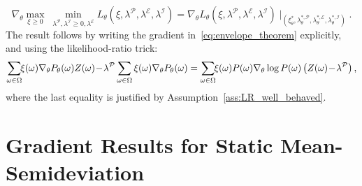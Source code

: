%
\begin{equation}\label{eq:envelope_theorem}
\nabla_\theta\max_{\xi\geq 0}\;\min_{\lambda^{\mathcal P},\lambda^{\mathcal I}\geq 0,\lambda^{\mathcal E}} L_{\theta}(\xi,\lambda^{\mathcal P},\lambda^{\mathcal E},\lambda^{\mathcal I}) = \nabla_\theta L_{\theta}(\xi,\lambda^{\mathcal P},\lambda^{\mathcal E},\lambda^{\mathcal I})\!\!\mid_{(\xi^*_{\theta},\lambda^{*,\mathcal P}_{\theta},\lambda^{*,\mathcal E}_{\theta},\lambda^{*,\mathcal I}_{\theta})}.
\end{equation}
%
The result follows by writing the gradient in~\eqref{eq:envelope_theorem} explicitly, and using the likelihood-ratio trick:
%
\begin{equation*}
   \sum_{\omega \in \Omega} \!\! \xi(\omega) \dt P_\theta(\omega) Z(\omega)\!-\!\lambda^{\mathcal P}\sum_{\omega \in \Omega}\xi(\omega)\dt P_\theta(\omega) = \sum_{\omega \in \Omega} \!\! \xi(\omega) P(\omega) \dt \log P(\omega) \left(Z(\omega)\!-\!\lambda^{\mathcal P}\right),
\end{equation*}
%
where the last equality is justified by Assumption~\ref{ass:LR_well_behaved}.


\section{Gradient Results for Static Mean-Semideviation}\label{sec:MSD_supp}

